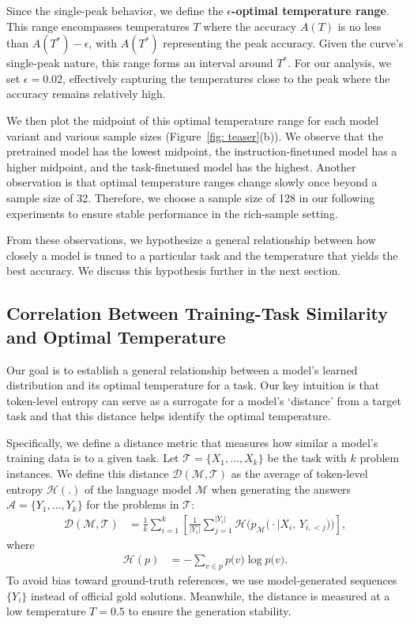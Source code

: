 Since the single-peak behavior, we define the \textbf{$\epsilon$-optimal temperature range}. This range encompasses temperatures $T$ where the accuracy $A(T)$ is no less than $A(T^*) - \epsilon$, with $A(T^*)$ representing the peak accuracy. Given the curve's single-peak nature, this range forms an interval around $T^*$. For our analysis, we set $\epsilon = 0.02$, effectively capturing the temperatures close to the peak where the accuracy remains relatively high.

We then plot the midpoint of this optimal temperature range for each model variant and various sample sizes (Figure~\ref{fig: teaser}(b)). We observe that the pretrained model has the lowest midpoint, the instruction-finetuned model has a higher midpoint, and the task-finetuned model has the highest. Another observation is that optimal temperature ranges change slowly once beyond a sample size of 32. Therefore, we choose a sample size of 128 in our following experiments to ensure stable performance in the rich-sample setting.

From these observations, we hypothesize a general relationship between how closely a model is tuned to a particular task and the temperature that yields the best accuracy. We discuss this hypothesis further in the next section.

\subsection{Correlation Between Training-Task Similarity and Optimal Temperature}
\label{sec: temperature correlation}
Our goal is to establish a general relationship between a model’s learned distribution and its optimal temperature for a task. Our key intuition is that token-level entropy can serve as a surrogate for a model's `distance' from a target task and that this distance helps identify the optimal temperature.

Specifically, we define a distance metric that measures how similar a model’s training data is to a given task. Let \(\mathcal{T} = \{X_1, ..., X_k\}\) be the task with $k$ problem instances. We define this distance \(\mathcal{D}(\mathcal{M}, \mathcal{T})\) as the average of token-level entropy \(\mathcal{H}(.)\) of the language model \(\mathcal{M}\) when generating the answers \(\mathcal{A} = \{Y_1, ..., Y_k\}\) for the problems in \(\mathcal{T}\):
\begin{align}
\mathcal{D}(\mathcal{M}, \mathcal{T})
&=
\frac{1}{k}
\sum_{i=1}^{k}
\left[
  \frac{1}{|Y_i|}
  \sum_{j=1}^{|Y_i|}
  \mathcal{H}\bigl(p_\mathcal{M}\bigl(\cdot \mid X_i,\,Y_{i,<j}\bigr)\bigr)
\right],
\end{align}
\vspace{-5mm}
where
\begin{align}
\label{eq: entropy}
\mathcal{H}(p)&=
  -\sum_{v \in p} 
     p\bigl(v) 
     \log p\bigl(v\bigr).
\end{align}
To avoid bias toward ground-truth references, we use model-generated sequences \(\{Y_i\}\) instead of official gold solutions. Meanwhile, the distance is measured at a low temperature $T=0.5$ to ensure the generation stability.

